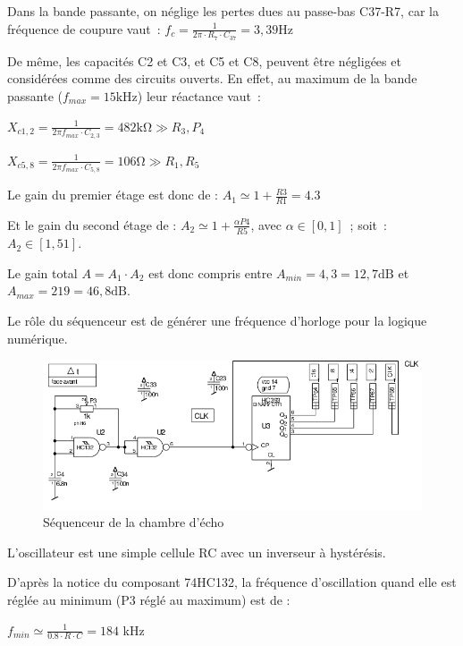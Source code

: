 \documentclass{article}
\begin{document}
Dans la bande passante, on néglige les pertes dues au passe-bas C37-R7, car la fréquence de coupure vaut~:
${f_c = \frac{1}{2 \pi \cdot R_7 \cdot C_{37}} = 3,39 \mathrm{Hz}}$

De même, les capacités C2 et C3, et C5 et C8, peuvent être négligées et considérées comme des circuits ouverts.
En effet, au maximum de la bande passante ($f_{max} = 15 \mathrm{kHz}$) leur réactance vaut~:
\begin{center}$X_{c1,2} = \frac{1}{2 \pi f_{max} \cdot C_{2,3}} = 482 \mathrm{k\Omega} \gg R_3, P_4 $\end{center}
\begin{center}$X_{c5,8} = \frac{1}{2 \pi f_{max} \cdot C_{5,8}} = 106 \mathrm{\Omega} \gg R_1, R_5 $\end{center}

Le gain du premier étage est donc de : $A_1 \simeq 1+\frac{R3}{R1} = 4.3 $

Et le gain du second étage de :
$A_2 \simeq 1+\frac{\alpha P4}{R5}$, avec $\alpha \in [0,1]$~; soit~: $A_2 \in [1,51]$.

Le gain total $A = A_1\cdot A_2$ est donc compris entre $A_{min} = 4,3 = 12,7 \mathrm{dB}$ et $A_{max} = 219 = 46,8 \mathrm{dB}$.


Le rôle du séquenceur est de générer une fréquence d'horloge pour la logique numérique.

\begin{figure}[h]
	\centering
	\includegraphics[width=.8\textwidth]{shema_sequenceur_1.png}
	\caption{Séquenceur de la chambre d'écho}
	\label{fig:seq}
\end{figure}

L'oscillateur est une simple cellule RC avec un inverseur à hystérésis.

D'après la notice du composant 74HC132, la fréquence d'oscillation quand elle est réglée au minimum (P3 réglé au maximum) est de :
\begin{center}
$f_{min} \simeq \frac{1}{0.8 \cdot R \cdot C} = 184 $ kHz
\end{center}
\end{document}
